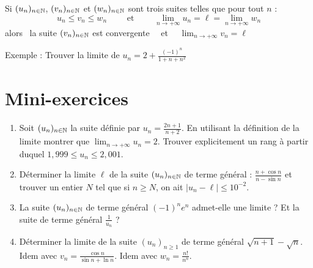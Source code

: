 \begin{frame}

\begin{theoreme}   
Si $(u_n)_{n\in \mathbb{N}}$, $(v_n)_{n\in \mathbb{N}}$ et $(w_n)_{n\in \mathbb{N}}$ sont trois suites telles que pour tout $n$ :
\[ u_n\leq v_n\leq w_n \qquad \text{ et } \qquad \lim_{n\to +\infty}u_n=\ell=\lim_{n\to +\infty}w_n\]
alors \ la suite $(v_n)_{n\in \mathbb{N}}$ est convergente \ \ et \ \ $\lim_{n\to +\infty} v_n=\ell$  
  
\end{theoreme}

\pause

  
\pause


Exemple : Trouver la limite de $\displaystyle u_n =2 +\frac{(-1)^n}{1+n+n^2}$


\end{frame}



\section{Mini-exercices}

 \begin{frame}
 \begin{miniexercice}
	 \begin{enumerate}
  \item Soit $(u_n)_{n\in \mathbb{N}}$ la suite définie par $u_n = \frac{2n+1}{n+2}$. 
En utilisant la définition de la limite montrer que $\lim_{n\to+\infty} u_n = 2$. 
Trouver explicitement un rang à partir duquel $1,999 \le u_n \le 2,001$. 

    \item  Déterminer la limite $\ell$ de la suite $(u_n)_{n\in \mathbb{N}}$ de terme général : 
$\frac{n+\cos n}{n-\sin n}$ et trouver un entier $N$ 
tel que si $n\geq N$, on ait $|u_n-\ell|\leq 10^{-2}$. 

  \item La suite $(u_n)_{n\in \mathbb{N}}$ de terme général $(-1)^ne^{n}$ admet-elle une limite ? 
Et la suite de terme général $\frac{1}{u_n}$ ? 

  \item  Déterminer la limite de la suite $(u_n)_{n\geq 1}$ de terme général $\sqrt{n+1}-\sqrt{n}$.  
   Idem avec $v_n = \frac{\cos n}{\sin n + \ln n}$. Idem avec $w_n=\frac{n!}{n^n}$.
  
  
  \end{enumerate}

 \end{miniexercice}
 \end{frame}





